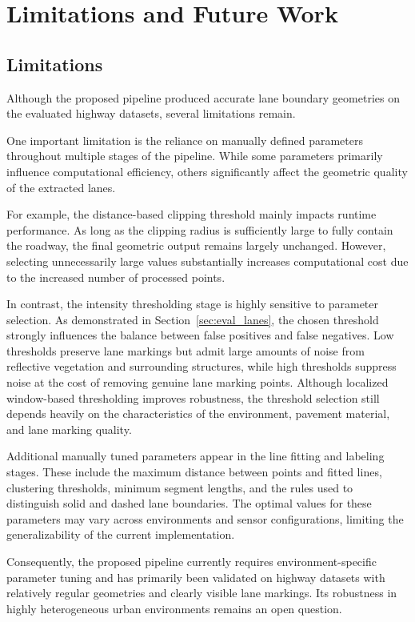 \chapter{Limitations and Future Work}
\label{ch:future}

\section{Limitations}
\label{sec:limitations}

Although the proposed pipeline produced accurate lane boundary geometries on the evaluated highway datasets, several limitations remain.

One important limitation is the reliance on manually defined parameters throughout multiple stages of the pipeline.
While some parameters primarily influence computational efficiency, others significantly affect the geometric quality of the extracted lanes.

For example, the distance-based clipping threshold mainly impacts runtime performance.
As long as the clipping radius is sufficiently large to fully contain the roadway, the final geometric output remains largely unchanged.
However, selecting unnecessarily large values substantially increases computational cost due to the increased number of processed points.

In contrast, the intensity thresholding stage is highly sensitive to parameter selection.
As demonstrated in Section~\ref{sec:eval_lanes}, the chosen threshold strongly influences the balance between false positives and false negatives.
Low thresholds preserve lane markings but admit large amounts of noise from reflective vegetation and surrounding structures, while high thresholds suppress noise at the cost of removing genuine lane marking points.
Although localized window-based thresholding improves robustness, the threshold selection still depends heavily on the characteristics of the environment, pavement material, and lane marking quality.

Additional manually tuned parameters appear in the line fitting and labeling stages.
These include the maximum distance between points and fitted lines, clustering thresholds, minimum segment lengths, and the rules used to distinguish solid and dashed lane boundaries.
The optimal values for these parameters may vary across environments and sensor configurations, limiting the generalizability of the current implementation.

Consequently, the proposed pipeline currently requires environment-specific parameter tuning and has primarily been validated on highway datasets with relatively regular geometries and clearly visible lane markings.
Its robustness in highly heterogeneous urban environments remains an open question.

